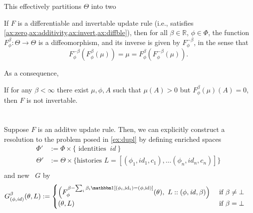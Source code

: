 This effectively partitions $\Theta$ into two


\begin{prop}
	If $F$ is a differentiable and invertable update rule (i.e., satisfies \cref{ax:zero,ax:additivity,ax:invert,ax:diffble}), then for all $\beta \in \mathbb R$, $\phi \in \Phi$, the function
	$F^\beta_\phi : \Theta \to \Theta$
	is a diffeomorphism, and its inverse is given by $F^{-\beta}_\phi$, in the sense that
	\[
		F^{-\beta}_\phi( F^{\beta}_\phi (\mu) ) = \mu = F^{\beta}_\phi( F^{-\beta}_\phi (\mu) ).
	 \]
\end{prop}




As a consequence,
\begin{coro}
	If for any $\beta < \infty$ there exist $\mu, \phi, A$ such that
	$\mu(A) > 0$  but $F^{\beta}_\phi(\mu)(A) = 0$, then $F$ is not invertable.
\end{coro}



\section{}
\begin{example}\label{ex:dupl-enriched}
Suppose $F$ is an additve update rule. Then, we can explicitly construct a resolution to the problem posed in \cref{ex:dupl} by defining enriched spaces
\begin{align*}
	\Phi' &:= \Phi \times \Big\{ \text{ identities }~ \mathit{id}~ \Big\}\\
	\Theta' &:= \Theta \times
		\Big\{ \text{histories } L = [(\phi_1, \mathit{id}_1, c_1), \ldots (\phi_n, \mathit{id}_n, c_n)] \Big\} \\
\end{align*}
and new \cofunc\ $G$ by
\begin{align*}
	 G^{\beta}_{(\phi,\mathit{id})}(\theta, L) & :=
		\begin{cases}
		\Big( F^{\beta- \sum_{i}\beta_i \mathbbm1[(\phi_i,\mathrm{id}_i) = (\phi, \mathrm{id})]}_{\phi}(\theta),~
			 L :: (\phi,\mathit{id}, \beta)
		 \Big)
			 &\text{ if } \beta \ne \bot \\
		(\theta, L) &
			   \text{ if } \beta = \bot
	\end{cases}
\end{align*}
\end{example}


